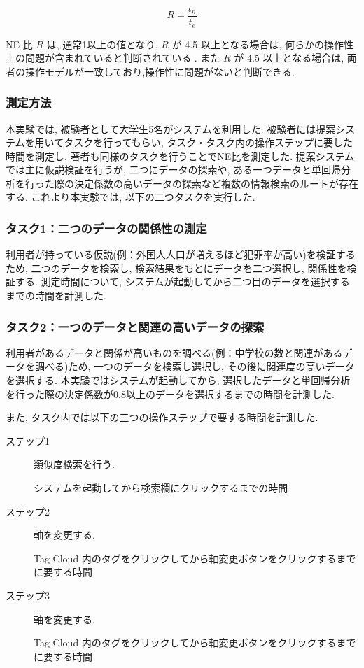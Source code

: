 \documentclass[sotsuron]{kuee}
\begin{document}
\begin{equation}
R = \frac{t_{n}}{t_{e}}
\end{equation}

NE 比 $R$ は, 通常1以上の値となり, $R$ が 4.5 以上となる場合は, 何らかの操作性上の問題が含まれていると判断されている
\cite{5.1.1-3}.  また $R$ が 4.5 以上となる場合は, 両者の操作モデルが一致しており,操作性に問題がないと判断できる.

\subsubsection{測定方法}

本実験では, 被験者として大学生5名がシステムを利用した.
被験者には提案システムを用いてタスクを行ってもらい, タスク・タスク内の操作ステップに要した時間を測定し, 著者も同様のタスクを行うことでNE比を測定した.
提案システムでは主に仮説検証を行うが, 二つにデータの探索や, ある一つデータと単回帰分析を行った際の決定係数の高いデータの探索など複数の情報検索のルートが存在する.
これより本実験では, 以下の二つタスクを実行した.

\subsubsection{タスク1：二つのデータの関係性の測定}

利用者が持っている仮説(例：外国人人口が増えるほど犯罪率が高い)を検証するため, 二つのデータを検索し, 検索結果をもとにデータを二つ選択し, 関係性を検証する.
測定時間について, システムが起動してから二つ目のデータを選択するまでの時間を計測した.

\subsubsection{タスク2：一つのデータと関連の高いデータの探索}

利用者があるデータと関係が高いものを調べる(例：中学校の数と関連があるデータを調べる)ため, 一つのデータを検索し選択し, その後に関連度の高いデータを選択する.
本実験ではシステムが起動してから, 選択したデータと単回帰分析を行った際の決定係数が0.8以上のデータを選択するまでの時間を計測した.

また, タスク内では以下の三つの操作ステップで要する時間を計測した.

\begin{description}
 \item[ステップ1] 類似度検索を行う.

  システムを起動してから検索欄にクリックするまでの時間
 \item[ステップ2] 軸を変更する.

 Tag Cloud 内のタグをクリックしてから軸変更ボタンをクリックするまでに要する時間
 \item[ステップ3] 軸を変更する.

 Tag Cloud 内のタグをクリックしてから軸変更ボタンをクリックするまでに要する時間
\end{description}
\end{document}
